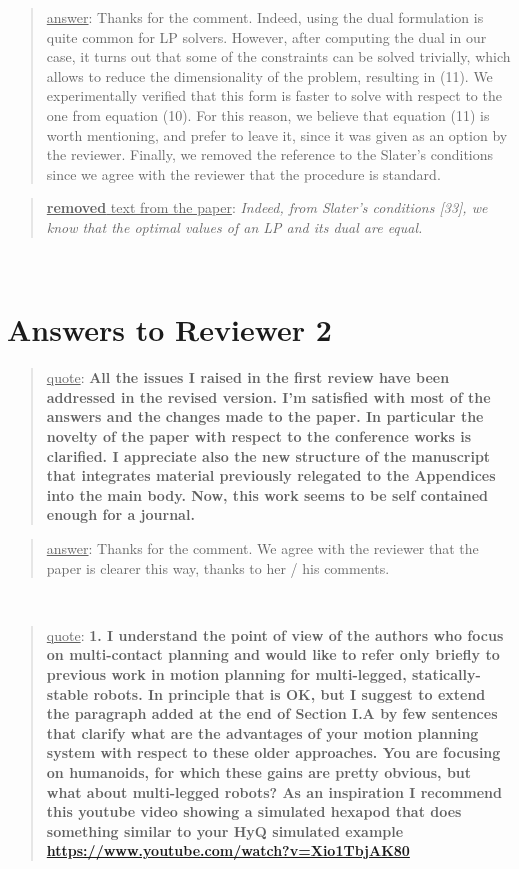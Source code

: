 \documentclass[a4paper]{article}
\newcommand\quot[1]{\begin{quote} \underline{quote}: \textbf{#1}\end{quote}}
\newcommand\as[1]{\begin{quote} \underline{answer}: {#1}\end{quote} }
\newcommand\rrt[1]{\begin{quote} \underline{\textbf{removed} text from the paper}: \textit{#1}\end{quote} \leavevmode \\ }
\begin{document}
\as{Thanks for the comment. Indeed, using the dual formulation is quite common for LP solvers. However, after computing the dual in our case, it turns out that some of the constraints can be solved trivially, which allows to reduce the dimensionality of the problem, resulting in (11). We experimentally verified that this form is faster to solve with respect to the one from equation (10). For this reason, we believe that equation (11) is worth mentioning, and prefer to leave it, since it was given as an option by the reviewer. Finally, we removed the reference to the Slater's conditions since we agree with the reviewer that the procedure is standard.}
\rrt{Indeed, from Slater’s conditions [33], we know that the optimal values of an LP and its dual are equal.}


\section{Answers to Reviewer 2}
\quot{All the issues I raised in the first review have been addressed in
the revised version. I'm satisfied with most of the answers and the
changes made to the paper. In particular the novelty of the paper with
respect to the conference works is clarified. I appreciate also the new
structure of the manuscript that integrates material previously
relegated to the Appendices into the main body. Now, this work seems to
be self contained enough for a journal. }
\as{Thanks for the comment. We agree with the reviewer that the paper is clearer this way, thanks to her / his comments.}

\leavevmode \\
\quot{
1. I understand the point of view of the authors who focus on
multi-contact planning and would like to refer only briefly to previous
work in motion planning for multi-legged, statically-stable robots. In
principle that is OK, but I suggest to extend the paragraph added at
the end of Section I.A by few sentences that clarify what are the
advantages of your motion planning system with respect to these older
approaches. You are focusing on humanoids, for which these gains are
pretty obvious, but what about multi-legged robots? As an inspiration I
recommend this youtube video showing a simulated hexapod that does
something similar to your HyQ simulated example
\url{https://www.youtube.com/watch?v=Xio1TbjAK80}}
\end{document}
